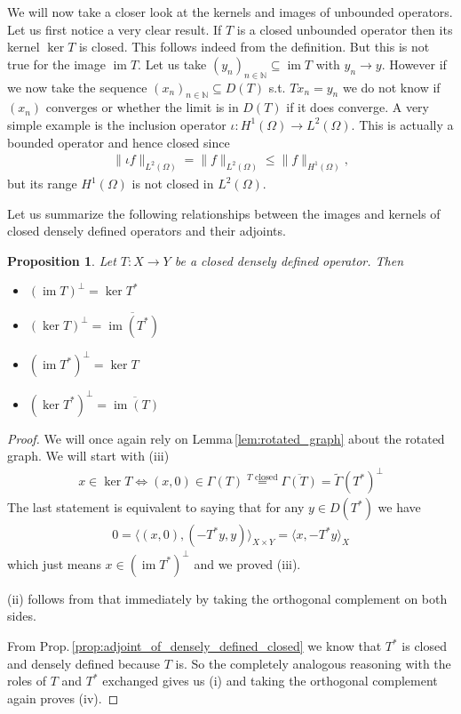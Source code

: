 \documentclass[12pt,a4paper]{article}
\numberwithin{equation}{subsection}
\numberwithin{lemma}{subsection}
\newtheorem{proposition}[lemma]{Proposition}
\theoremstyle{definition}
\DeclareMathOperator{\Ima}{im}
\newcommand{\naturalnum}{\mathbb{N}}
\begin{document}
We will now take a closer look at the kernels and images of unbounded operators.
Let us first notice a very clear result. If $T$ is a closed unbounded operator 
then its kernel $\ker T$ is closed. This follows indeed from the definition. 
But this is not true for the image $\Ima T$. Let us take
$(y_n)_{n \in \naturalnum} \subseteq \Ima T$ with $y_n \rightarrow y$.
However if we now take the sequence $(x_n)_{n \in \naturalnum} \subseteq D(T)$
s.t. $Tx_n = y_n$ we do not know if $(x_n)$ converges or 
whether the limit is in $D(T)$ if it does converge. 
A very simple example is the inclusion operator
$\iota: H^1(\Omega) \rightarrow L^2(\Omega)$. This is actually a bounded 
operator and hence closed since 
\begin{align*}
    \lVert \iota f \rVert _{L^2(\Omega)} 
    = \lVert f \rVert _{L^2(\Omega)} 
    \leq \lVert f \rVert _{H^1(\Omega)},
\end{align*}
but its range $H^1(\Omega)$ is not closed in $L^2(\Omega)$.

Let us summarize the following relationships between the images and kernels 
of closed densely defined operators and their adjoints.

\begin{proposition}\label{prop:kernel_image_adjoint}
    Let $T: X \rightarrow Y$ be a closed densely defined operator. Then
    \begin{itemize}
        \item $(\Ima T)^\perp = \ker T^*$
        \item $(\ker T)^\perp = \overline{\Ima(T^*)}$
        \item $(\Ima T^*)^\perp = \ker T$
        \item $(\ker T^*)^\perp = \overline{\Ima(T)}$
    \end{itemize}
\end{proposition}
\begin{proof}
    We will once again rely on Lemma\,\ref{lem:rotated_graph} about the 
    rotated graph. We will start with (iii)
    \begin{align*}
        x \in \ker T \Leftrightarrow (x,0) \in \Gamma(T) 
        \stackrel{\text{$T$ closed}}{=} \overline{\Gamma(T)} 
        = \tilde{\Gamma}(T^*)^\perp 
    \end{align*}
    The last statement is equivalent to saying that for any $y \in D(T^*)$ 
    we have 
    \begin{align*}
        0 = \langle (x,0), (-T^*y,y) \rangle_{X \times Y}
        = \langle x, -T^*y \rangle_X
    \end{align*}
    which just means $x \in (\Ima T^*)^\perp$ and we proved (iii).

    (ii) follows from that immediately by taking the orthogonal complement 
    on both sides.

    From Prop.\,\ref{prop:adjoint_of_densely_defined_closed} 
    we know that $T^*$ is closed and densely defined because $T$
    is. So the completely analogous reasoning with the roles of $T$ and $T^*$
    exchanged gives us (i) and taking the orthogonal complement again 
    proves (iv).
\end{proof}
\end{document}
